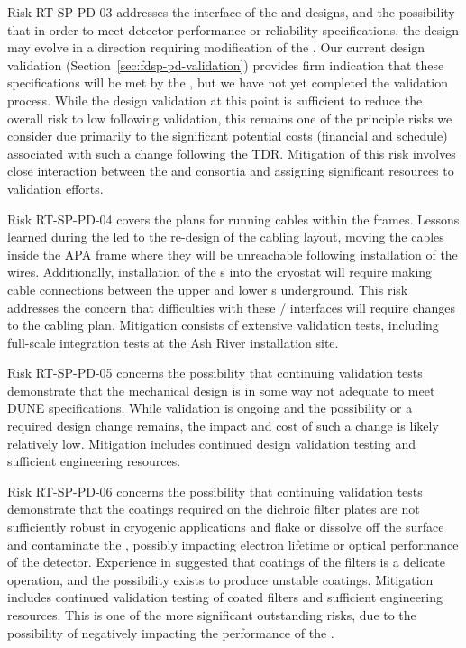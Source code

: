Risk RT-SP-PD-03 addresses the interface of the  and  designs, and the possibility that in order to meet detector performance or reliability specifications, the  design may evolve in a direction requiring modification of the .  Our current design validation (Section~\ref{sec:fdsp-pd-validation}) provides firm indication that these specifications will be met by the , but we have not yet completed the validation process.  While the design validation at this point is sufficient to reduce the overall risk to low following validation, this remains one of the principle risks we consider due primarily to the significant potential costs (financial and schedule) associated with such a change following the TDR.  Mitigation of this risk involves close interaction between the  and  consortia and assigning significant resources to  validation efforts.

Risk RT-SP-PD-04 covers the plans for running  cables within the  frames.  Lessons learned during the  led to the re-design of the  cabling layout, moving the cables inside the APA frame where they will be unreachable following installation of the  wires.  Additionally, installation of the s into the cryostat will require making  cable connections between the upper and lower s underground.  This risk addresses the concern that difficulties with these / interfaces will require changes to the cabling plan.  Mitigation consists of extensive validation tests, including full-scale integration tests at the Ash River installation site.

Risk RT-SP-PD-05 concerns the possibility that continuing validation tests demonstrate that the  mechanical design is in some way not adequate to meet DUNE specifications.  While validation is ongoing and the possibility or a required design change remains, the impact and cost of such a change is likely relatively low.  Mitigation includes continued design validation testing and sufficient engineering resources.

Risk RT-SP-PD-06 concerns the possibility that continuing validation tests demonstrate that the coatings required on the dichroic filter plates are not sufficiently robust in cryogenic applications and flake or dissolve off the surface and contaminate the , possibly impacting electron lifetime or optical performance of the detector.  Experience in  suggested that coatings of the filters is a delicate operation, and the possibility exists to produce unstable coatings.  Mitigation includes continued validation testing of coated filters and sufficient engineering resources.  This is one of the more significant outstanding risks, due to the possibility of negatively impacting the performance of the .

